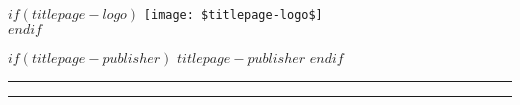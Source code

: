 $if(titlepage-logo)$
\texttt{[image: \$titlepage-logo\$]}\\[1cm] 
$endif$

$if(titlepage-publisher)$
{\large\textsc{$titlepage-publisher$}} %
$endif$

\vspace{0.1\textheight} %


\rule{\textwidth}{0.4pt} %

\vspace{2pt}\vspace{-\baselineskip} %

\rule{\textwidth}{1pt} %


